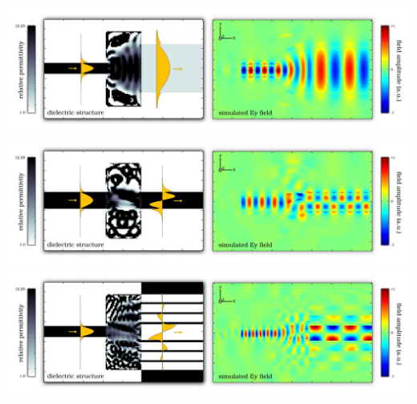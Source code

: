 \documentclass{letter}
\begin{document}
\includegraphics[width=\textwidth]{fig/fiber.jpg}
\includegraphics[width=\textwidth]{fig/mode-conv.jpg}
\includegraphics[width=\textwidth]{fig/air-core.jpg}
\end{document}
